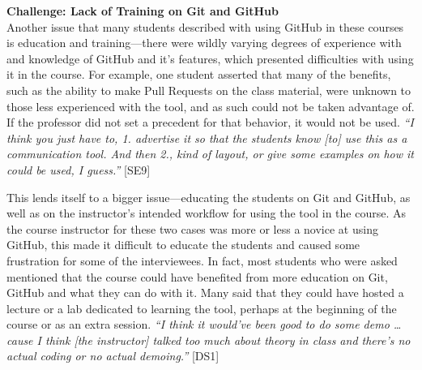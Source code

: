 
\textbf{Challenge: Lack of Training on Git and GitHub} \\
Another issue that many students described with using GitHub in these courses is education and training---there were wildly varying degrees of experience with and knowledge of GitHub and it's features, which presented difficulties with using it in the course. For example, one student asserted that many of the benefits, such as the ability to make Pull Requests on the class material, were unknown to those less experienced with the tool, and as such could not be taken advantage of. If the professor did not set a precedent for that behavior, it would not be used. \textit{``I think you just have to, 1. advertise it so that the students know [to] use this as a communication tool. And then 2., kind of layout, or give some examples on how it could be used, I guess.''} [SE9]

This lends itself to a bigger issue---educating the students on Git and GitHub, as well as on the instructor's intended workflow for using the tool in the course. As the course instructor for these two cases was more or less a novice at using GitHub, this made it difficult to educate the students and caused some frustration for some of the interviewees. In fact, most students who were asked mentioned that the course could have benefited from more education on Git, GitHub and what they can do with it. Many said that they could have hosted a lecture or a lab dedicated to learning the tool, perhaps at the beginning of the course or as an extra session. \textit{``I think it would've been good to do some demo \ldots cause I think [the instructor] talked too much about theory in class and there's no actual coding or no actual demoing.''} [DS1]


